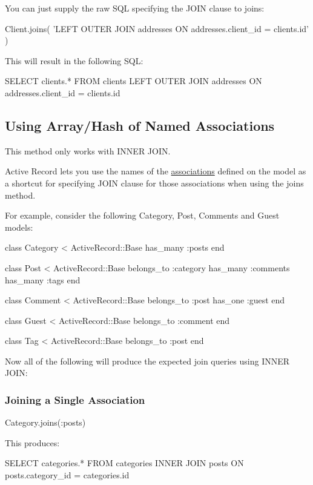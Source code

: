 \documentclass[10pt]{book}
\newenvironment{code}{%
  \scriptsize
    \verbatim
}{%
    \endverbatim
    \newline
}
\begin{document}
You can just supply the raw SQL specifying the JOIN clause to joins:
\begin{code}
Client.joins(
'LEFT OUTER JOIN addresses ON addresses.client_id = clients.id'
)
\end{code}

This will result in the following SQL:
\begin{code}
SELECT clients.* FROM clients 
LEFT OUTER JOIN addresses 
ON addresses.client_id = clients.id
\end{code}

\subsection{ Using Array/Hash of Named Associations}

This method only works with INNER JOIN.

Active Record lets you use the names of the \href{http://guides.rubyonrails.org/association_basics.html}{associations} defined on the model as a shortcut for specifying JOIN clause for those associations when using the joins method.

For example, consider the following Category, Post, Comments and Guest models:
\begin{code}
class Category < ActiveRecord::Base
  has_many :posts
end
 
class Post < ActiveRecord::Base
  belongs_to :category
  has_many :comments
  has_many :tags
end
 
class Comment < ActiveRecord::Base
  belongs_to :post
  has_one :guest
end
 
class Guest < ActiveRecord::Base
  belongs_to :comment
end
 
class Tag < ActiveRecord::Base
  belongs_to :post
end
\end{code}

Now all of the following will produce the expected join queries using INNER JOIN:

\subsubsection{ Joining a Single Association}
\begin{code}
Category.joins(:posts)
\end{code}

This produces:
\begin{code}
SELECT categories.* FROM categories
  INNER JOIN posts ON posts.category_id = categories.id
\end{code}
\end{document}
